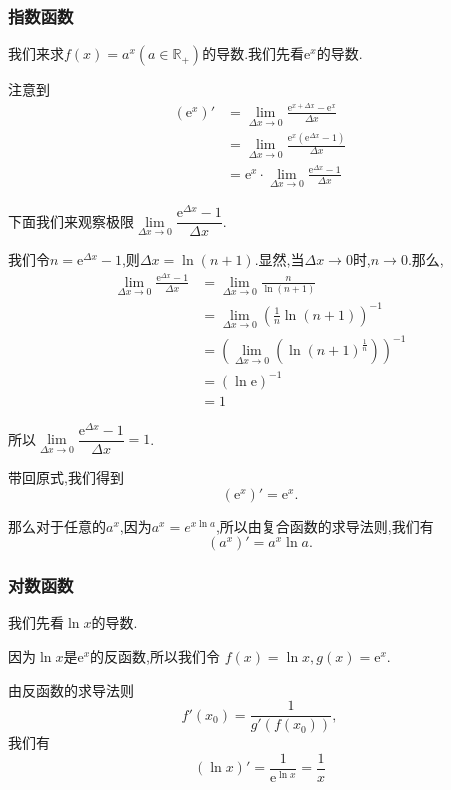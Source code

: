 \documentclass{article}
\begin{document}
\subsubsection{指数函数}
我们来求$f(x)=a^x (a\in\mathbb{R_+})$的导数.我们先看$\mathrm{e}^x$的导数.
\par 注意到
\begin{align*}
\left(\mathrm{e}^x\right)'&=\lim\limits_{\Delta x\to0}\frac{\mathrm{e}^{x+\Delta x}-\mathrm{e}^x}{\Delta x}\\
&=\lim\limits_{\Delta x\to0}\frac{\mathrm{e}^x(\mathrm{e}^{\Delta x}-1)}{\Delta x}\\
&=\mathrm{e}^x\cdot\lim\limits_{\Delta x\to0}\frac{\mathrm{e}^{\Delta x}-1}{\Delta x}
\end{align*}
\par 下面我们来观察极限$\lim\limits_{\Delta x\to0}\dfrac{\mathrm{e}^{\Delta x}-1}{\Delta x}$.\\
\par 我们令$n=\mathrm{e}^{\Delta x}-1$,则$\Delta x=\ln{(n+1)}$.显然,当$\Delta x\to0$时,$n\to0$.那么,
\begin{align*}
\lim\limits_{\Delta x\to0}\frac{\mathrm{e}^{\Delta x}-1}{\Delta x}
&=\lim\limits_{\Delta x\to0}\frac{n}{\ln{(n+1)}}\\
&=\lim\limits_{\Delta x\to0}\left(\frac{1}{n}\ln{(n+1)}\right)^{-1}\\
&=\left(\lim\limits_{\Delta x\to0}\left(\ln{(n+1)^\frac{1}{n}}\right)\right)^{-1}\\
&=(\ln{\mathrm{e}})^{-1}\\
&=1
\end{align*}
\par 所以$\lim\limits_{\Delta x\to0}\dfrac{\mathrm{e}^{\Delta x}-1}{\Delta x}=1$.\\
\par 带回原式,我们得到\[\left(\mathrm{e}^x\right)'=\mathrm{e}^x.\]
\par 那么对于任意的$a^x$,因为$a^x=e^{x\ln{a}}$,所以由复合函数的求导法则,我们有
\[\left(a^x\right)'=a^x\ln{a}.\]
\subsubsection{对数函数}
我们先看$\ln{x}$的导数.
\par 因为$\ln{x}$是$\mathrm{e}^x$的反函数,所以我们令 $f(x)=\ln{x},g(x)=\mathrm{e}^x$.
\par 由反函数的求导法则
\[f'(x_0)=\frac{1}{g'(f(x_0))},\]
我们有
\[(\ln{x})'=\frac{1}{\mathrm{e}^{\ln{x}}}=\frac{1}{x}\]
\end{document}
